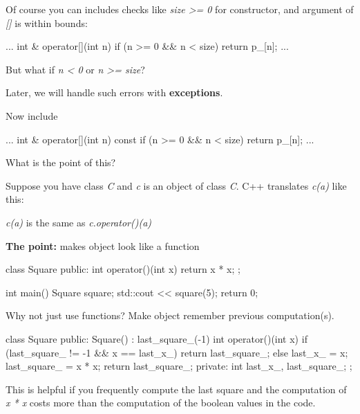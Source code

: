 Of course you can includes checks like \textit{size >= 0} for
constructor, and argument of \textit{[]} is within bounds:

\begin{consolethree}[escapeinside=||]
...
int & operator[](int n)
{
    if (n >= 0 && n < size)
        return p_[n];
}
...
\end{consolethree}

But what if \textit{n < 0} or \textit{n >= size}?

Later, we will handle such errors with \textbf{exceptions}.

Now include

\begin{consolethree}[escapeinside=||]
...
int & operator[](int n) const
{
    if (n >= 0 && n < size)
        return p_[n];
}
...
\end{consolethree}

What is the point of this?


\newpage{}

Suppose you have class \textit{C} and \textit{c} is an object of class
\textit{C}. C++ translates \textit{c(a)} like this:

\textit{c(a)} is the same as \textit{c.operator()(a)}

\textbf{The point:} makes object look like a function

\begin{consolethree}[escapeinside=||]
class Square
{
public:
    int operator()(int x)
    {
        return x * x;
    }
};

int main()
{
    Square square;
    std::cout << square(5);
    return 0;
}
\end{consolethree}

Why not just use functions? Make object remember previous
computation(s).

\begin{consolethree}[escapeinside=||]
class Square
{
public:
    Square()
        : last_square_(-1)
    {}
    int operator()(int x)
    {
        if (last_square_ != -1 && x == last_x_)
        {
            return last_square_;
        }
        else
        {
            last_x_ = x;
            last_square_ = x * x;
            return last_square_;
        }
    }
private:
    int last_x_, last_square_;
};
\end{consolethree}

This is helpful if you frequently compute the last square and the
computation of \textit{x * x} costs more than the computation of the
boolean values in the code.

